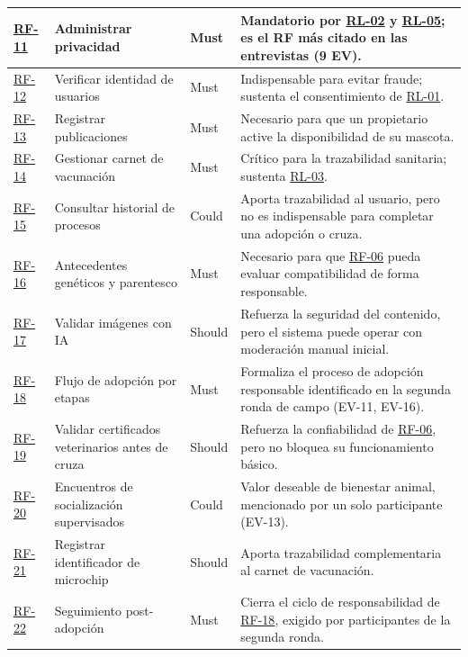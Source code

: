 \documentclass[journal,onecolumn]{IEEEtran}
\begin{document}
\begin{longtable}{@{}p{1.6cm} p{4.8cm} p{1.6cm} p{5.2cm}@{}}
		\hline
		\hyperref[tab:RF-11]{RF-11} & Administrar privacidad & Must & Mandatorio por \hyperref[rl:02]{RL-02} y \hyperref[rl:05]{RL-05}; es el RF más citado en las entrevistas (9 EV). \\
		\hline
		\hyperref[tab:RF-12]{RF-12} & Verificar identidad de usuarios & Must & Indispensable para evitar fraude; sustenta el consentimiento de \hyperref[rl:01]{RL-01}. \\
		\hline
		\hyperref[tab:RF-13]{RF-13} & Registrar publicaciones & Must & Necesario para que un propietario active la disponibilidad de su mascota. \\
		\hline
		\hyperref[tab:RF-14]{RF-14} & Gestionar carnet de vacunación & Must & Crítico para la trazabilidad sanitaria; sustenta \hyperref[rl:03]{RL-03}. \\
		\hline
		\hyperref[tab:RF-15]{RF-15} & Consultar historial de procesos & Could & Aporta trazabilidad al usuario, pero no es indispensable para completar una adopción o cruza. \\
		\hline
		\hyperref[tab:RF-16]{RF-16} & Antecedentes genéticos y parentesco & Must & Necesario para que \hyperref[tab:RF-06]{RF-06} pueda evaluar compatibilidad de forma responsable. \\
		\hline
		\hyperref[tab:RF-17]{RF-17} & Validar imágenes con IA & Should & Refuerza la seguridad del contenido, pero el sistema puede operar con moderación manual inicial. \\
		\hline
		\hyperref[tab:RF-18]{RF-18} & Flujo de adopción por etapas & Must & Formaliza el proceso de adopción responsable identificado en la segunda ronda de campo (EV-11, EV-16). \\
		\hline
		\hyperref[tab:RF-19]{RF-19} & Validar certificados veterinarios antes de cruza & Should & Refuerza la confiabilidad de \hyperref[tab:RF-06]{RF-06}, pero no bloquea su funcionamiento básico. \\
		\hline
		\hyperref[tab:RF-20]{RF-20} & Encuentros de socialización supervisados & Could & Valor deseable de bienestar animal, mencionado por un solo participante (EV-13). \\
		\hline
		\hyperref[tab:RF-21]{RF-21} & Registrar identificador de microchip & Should & Aporta trazabilidad complementaria al carnet de vacunación. \\
		\hline
		\hyperref[tab:RF-22]{RF-22} & Seguimiento post-adopción & Must & Cierra el ciclo de responsabilidad de \hyperref[tab:RF-18]{RF-18}, exigido por participantes de la segunda ronda. \\

\end{longtable}
\end{document}
